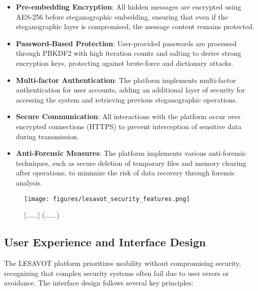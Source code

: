 \documentclass[12pt, a4paper, oneside]{book}
\begin{document}
\begin{itemize}[leftmargin=*]
    \item \textbf{Pre-embedding Encryption}: All hidden messages are encrypted using AES-256 before steganographic embedding, ensuring that even if the steganographic layer is compromised, the message content remains protected.

    \item \textbf{Password-Based Protection}: User-provided passwords are processed through PBKDF2 with high iteration counts and salting to derive strong encryption keys, protecting against brute-force and dictionary attacks.

    \item \textbf{Multi-factor Authentication}: The platform implements multi-factor authentication for user accounts, adding an additional layer of security for accessing the system and retrieving previous steganographic operations.

    \item \textbf{Secure Communication}: All interactions with the platform occur over encrypted connections (HTTPS) to prevent interception of sensitive data during transmission.

    \item \textbf{Anti-Forensic Measures}: The platform implements various anti-forensic techniques, such as secure deletion of temporary files and memory clearing after operations, to minimize the risk of data recovery through forensic analysis.
\end{itemize}

\begin{figure}[htbp]
    \centering
    \texttt{[image: figures/lesavot\_security\_features.png]}
    \caption{[......] (......)}
    \label{fig:lesavot_security}
\end{figure}

\subsection{User Experience and Interface Design}
The LESAVOT platform prioritizes usability without compromising security, recognizing that complex security systems often fail due to user errors or avoidance. The interface design follows several key principles:
\end{document}
